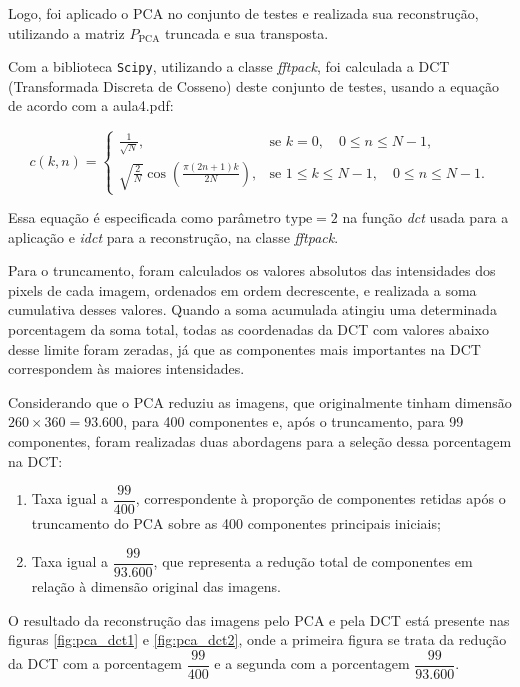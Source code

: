 \documentclass[a4paper, 11pt]{article}
\begin{document}
Logo, foi aplicado o PCA no conjunto de testes e realizada sua reconstrução, utilizando a matriz \( P_{\text{PCA}} \) truncada e sua transposta.

Com a biblioteca \texttt{Scipy}, utilizando a classe \textit{fftpack}, foi calculada a DCT (Transformada Discreta de Cosseno) deste conjunto de testes, usando a equação de acordo com a aula4.pdf:

\begin{equation}
c(k, n) = 
\begin{cases} 
\frac{1}{\sqrt{N}}, & \text{se } k = 0, \quad 0 \leq n \leq N - 1, \\[10pt]
\sqrt{\frac{2}{N}} \cos\left(\frac{\pi (2n + 1) k}{2N}\right), & \text{se } 1 \leq k \leq N - 1, \quad 0 \leq n \leq N - 1.
\end{cases}
\end{equation}

Essa equação é especificada como parâmetro $\text{type}=2$ na função \textit{dct} usada para a aplicação e \textit{idct} para a reconstrução, na classe \textit{fftpack}. 

Para o truncamento, foram calculados os valores absolutos das intensidades dos pixels de cada imagem, ordenados em ordem decrescente, e realizada a soma cumulativa desses valores. Quando a soma acumulada atingiu uma determinada porcentagem da soma total, todas as coordenadas da DCT com valores abaixo desse limite foram zeradas, já que as componentes mais importantes na DCT correspondem às maiores intensidades.

Considerando que o PCA reduziu as imagens, que originalmente tinham dimensão \( 260 \times 360 = 93.600 \), para 400 componentes e, após o truncamento, para 99 componentes, foram realizadas duas abordagens para a seleção dessa porcentagem na DCT:

\begin{enumerate}
    \item Taxa igual a \( \dfrac{99}{400} \), correspondente à proporção de componentes retidas após o truncamento do PCA sobre as 400 componentes principais iniciais;
    \item Taxa igual a \( \dfrac{99}{93.600} \), que representa a redução total de componentes em relação à dimensão original das imagens.
\end{enumerate}

O resultado da reconstrução das imagens pelo PCA e pela DCT está presente nas figuras \ref{fig:pca_dct1} e \ref{fig:pca_dct2}, onde a primeira figura se trata da redução da DCT com a porcentagem \( \dfrac{99}{400} \) e a segunda com a porcentagem \( \dfrac{99}{93.600} \).
\end{document}
